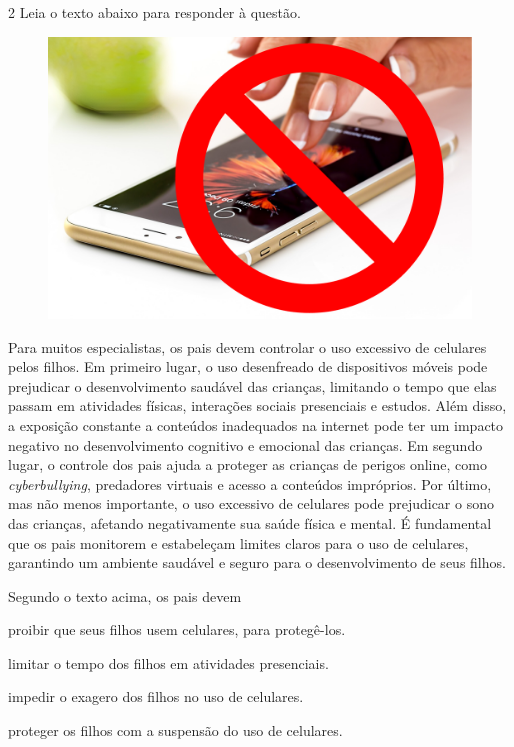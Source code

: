 \pagebreak
\num{2} Leia o texto abaixo para responder à questão. 

\begin{myquote}

\begin{figure}
\includegraphics[width=.7\textwidth]{./imgSAEB_7_POR/media/image39.png}
\end{figure} 

Para muitos especialistas, os pais devem controlar o uso excessivo de celulares 
pelos filhos. Em primeiro lugar, o uso desenfreado de dispositivos
móveis pode prejudicar o desenvolvimento saudável das crianças, limitando o
tempo que elas passam em atividades físicas, interações sociais presenciais e
estudos. Além disso, a exposição constante a conteúdos inadequados na internet
pode ter um impacto negativo no desenvolvimento cognitivo e emocional das
crianças. Em segundo lugar, o controle dos pais ajuda a proteger as crianças
de perigos online, como \textit{cyberbullying}, predadores virtuais e acesso a
conteúdos impróprios. Por último, mas não menos importante, o uso excessivo de
celulares pode prejudicar o sono das crianças, afetando negativamente sua
saúde física e mental. É fundamental que os pais monitorem e
estabeleçam limites claros para o uso de celulares, garantindo um ambiente
saudável e seguro para o desenvolvimento de seus filhos.


\end{myquote}

Segundo o texto acima, os pais devem

\begin{escolha}

  \item proibir que seus filhos usem celulares, para protegê-los.
  
  \item limitar o tempo dos filhos em atividades presenciais.
  
  \item impedir o exagero dos filhos no uso de celulares.
  
  \item proteger os filhos com a suspensão do uso de celulares.

\end{escolha}

